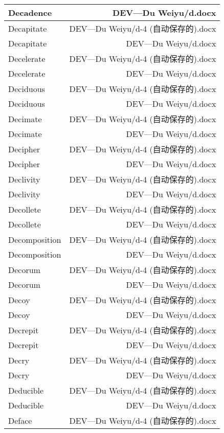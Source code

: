 \documentclass{article}
\begin{document}
\begin{center}
\begin{longtable}{|l|r|}
\hline
Decadence  &  DEV---Du Weiyu/d.docx\\  
\hline
Decapitate  &  DEV---Du Weiyu/d-4 (自动保存的).docx\\  
\hline
Decapitate  &  DEV---Du Weiyu/d.docx\\  
\hline
Decelerate  &  DEV---Du Weiyu/d-4 (自动保存的).docx\\  
\hline
Decelerate  &  DEV---Du Weiyu/d.docx\\  
\hline
Deciduous  &  DEV---Du Weiyu/d-4 (自动保存的).docx\\  
\hline
Deciduous  &  DEV---Du Weiyu/d.docx\\  
\hline
Decimate  &  DEV---Du Weiyu/d-4 (自动保存的).docx\\  
\hline
Decimate  &  DEV---Du Weiyu/d.docx\\  
\hline
Decipher  &  DEV---Du Weiyu/d-4 (自动保存的).docx\\  
\hline
Decipher  &  DEV---Du Weiyu/d.docx\\  
\hline
Declivity  &  DEV---Du Weiyu/d-4 (自动保存的).docx\\  
\hline
Declivity  &  DEV---Du Weiyu/d.docx\\  
\hline
Decollete  &  DEV---Du Weiyu/d-4 (自动保存的).docx\\  
\hline
Decollete  &  DEV---Du Weiyu/d.docx\\  
\hline
Decomposition  &  DEV---Du Weiyu/d-4 (自动保存的).docx\\  
\hline
Decomposition  &  DEV---Du Weiyu/d.docx\\  
\hline
Decorum  &  DEV---Du Weiyu/d-4 (自动保存的).docx\\  
\hline
Decorum  &  DEV---Du Weiyu/d.docx\\  
\hline
Decoy  &  DEV---Du Weiyu/d-4 (自动保存的).docx\\  
\hline
Decoy  &  DEV---Du Weiyu/d.docx\\  
\hline
Decrepit  &  DEV---Du Weiyu/d-4 (自动保存的).docx\\  
\hline
Decrepit  &  DEV---Du Weiyu/d.docx\\  
\hline
Decry  &  DEV---Du Weiyu/d-4 (自动保存的).docx\\  
\hline
Decry  &  DEV---Du Weiyu/d.docx\\  
\hline
Deducible  &  DEV---Du Weiyu/d-4 (自动保存的).docx\\  
\hline
Deducible  &  DEV---Du Weiyu/d.docx\\  
\hline
Deface  &  DEV---Du Weiyu/d-4 (自动保存的).docx\\  

\end{longtable}
\end{center}
\end{document}
